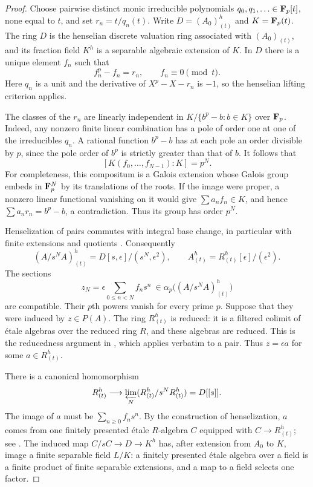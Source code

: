 \begin{proof}
Choose pairwise distinct monic irreducible polynomials
$q_0,q_1,\ldots\in\mathbf F_p[t]$, none equal to $t$, and set
$r_n=t/q_n(t)$. Write $D=(A_0)^h_{(t)}$ and $K=\mathbf F_p(t)$.
The ring $D$ is the henselian discrete valuation ring associated
with $(A_0)_{(t)}$, and its fraction field $K^h$ is a separable
algebraic extension of $K$. In $D$ there is a unique element $f_n$
such that
\[
 f_n^p-f_n=r_n,\qquad f_n\equiv0\pmod t.
\]
Here $q_n$ is a unit and the derivative of $X^p-X-r_n$ is $-1$,
so the henselian lifting criterion applies.

The classes of the $r_n$ are linearly independent in
$K/\{b^p-b:b\in K\}$ over $\mathbf F_p$. Indeed, any nonzero finite
linear combination has a pole of order one at one of the
irreducibles $q_n$. A rational function $b^p-b$ has at each pole
an order divisible by $p$, since the pole order of $b^p$ is
strictly greater than that of $b$.
It follows that
\[
 [K(f_0,\ldots,f_{N-1}):K]=p^N.                 \tag{A.2.1}
\]
For completeness, this compositum is a Galois extension whose
Galois group embeds in $\mathbf F_p^N$ by its translations of the roots.
If the image were proper, a nonzero linear functional vanishing
on it would give $\sum a_nf_n\in K$, and hence
$\sum a_nr_n=b^p-b$, a contradiction. Thus its group has order
$p^N$.

Henselization of pairs commutes with integral base change, in
particular with finite extensions and quotients
\cite[Lemma 15.12.7]{StacksHenselPairs}. Consequently
\[
 (A/s^N A)^h_{(t)}=D[s,\epsilon]/(s^N,\epsilon^2),
 \qquad
 A^h_{(t)}=R^h_{(t)}[\epsilon]/(\epsilon^2).
\]
The sections
\[
 z_N=\epsilon\sum_{0\leq n<N}f_ns^n
 \ \in\alpha_p\bigl((A/s^N A)^h_{(t)}\bigr)
\]
are compatible. Their $p$th powers vanish for every prime $p$.
Suppose that they were induced by $z\in P(A)$.
The ring $R^h_{(t)}$ is reduced: it is a filtered colimit of
\'etale algebras over the reduced ring $R$, and these algebras
are reduced. This is the reducedness argument in
\cite[Lemma 15.46.4]{StacksHenselReduced}, which applies verbatim
to a pair. Thus $z=\epsilon a$ for some $a\in R^h_{(t)}$.

There is a canonical homomorphism
\[
 R^h_{(t)}\longrightarrow
 \varprojlim_N (R^h_{(t)}/s^N R^h_{(t)})=D[[s]].
\]
The image of $a$ must be $\sum_{n\geq0}f_ns^n$.
By the construction of henselization, $a$ comes from one
finitely presented \'etale $R$-algebra $C$ equipped with
$C\to R^h_{(t)}$; see
\cite[Lemma 15.12.1]{StacksHenselPairs}.
The induced map $C/sC\to D\to K^h$ has, after extension from
$A_0$ to $K$, image a finite separable field $L/K$: a finitely
presented \'etale algebra over a field is a finite product of
finite separable extensions, and a map to a field selects one
factor.


\end{proof}
